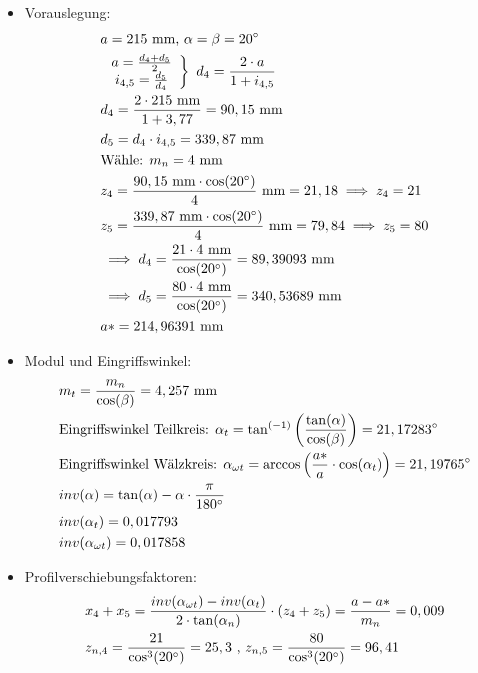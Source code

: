 \begin{itemize}
\item Vorauslegung:
\begin{align*}
	&a= 215 \text{ mm, } \alpha = \beta = 20^\circ \\
	&\left. \begin{array}{c} a= \frac{d_4 + d_5}{2}\\i_{4,5} = \frac{d_5}{d_4} \end{array} \right\} \text{ }d_4 = \frac{2 \cdot a}{1+i_{4,5}} \\
	&d_4 = \frac{2\cdot 215 \text{ mm}}{1+3,77} = 90,15\text{ mm} \\
	&d_5 = d_4 \cdot i_{4,5} = 339,87 \text{ mm}\\
	&\text{Wähle: }m_n = 4 \text{ mm} \\
	&z_4 = \frac{90,15 \text{ mm} \cdot \cos(20^\circ)}{4 } \text{ mm} = 21,18 \implies z_4 = 21\\
	&z_5 = \frac{339,87 \text{ mm} \cdot \cos(20^\circ)}{4 } \text{ mm} = 79,84 \implies z_5 = 80 \\
	&\implies d_4 = \frac{21 \cdot 4\text{ mm} }{\cos(20^\circ)} = 89,39093 \text{ mm} \\
	&\implies d_5 = \frac{80\cdot 4\text{ mm} }{\cos(20^\circ)} = 340,53689 \text{ mm} \\
	&a* = 214,96391 \text{ mm} 
\end{align*}
\item Modul und Eingriffswinkel:
\begin{align*}
	&m_t = \frac{m_n}{\cos(\beta)} = 4,257\text{ mm} \\
	&\text{Eingriffswinkel Teilkreis: } \alpha_t = \tan^{(-1)} \left( \frac{\tan(\alpha)}{\cos(\beta)} \right) = 21,17283 ^\circ \\
	&\text{Eingriffswinkel Wälzkreis: } \alpha_{\omega t} = \arccos \left( \frac{a*}{a} \cdot \cos(\alpha_t)\right) = 21,19765 ^\circ \\
	&inv(\alpha) = \tan(\alpha) -\alpha \cdot \frac{\pi}{180^\circ} \\
	&inv(\alpha_t) = 0,017793 \\
	&inv(\alpha_{\omega t}) = 0,017858 
\end{align*}
\item Profilverschiebungsfaktoren:
\begin{align*}
	&x_4 + x_5 = \frac{inv(\alpha_{\omega t})-inv(\alpha_{t})}{2 \x \tan(\alpha_{n})} \x (z_4 + z_5) = \frac{a - a*}{m_n} = 0,009 \\
	&z_{n,4} = \frac{21}{\cos^3(20^\circ)} = 25,3 \text{ , }z_{n,5} = \frac{80}{\cos^3(20^\circ)} = 96,41 \\

\end{align*}
\end{itemize}
